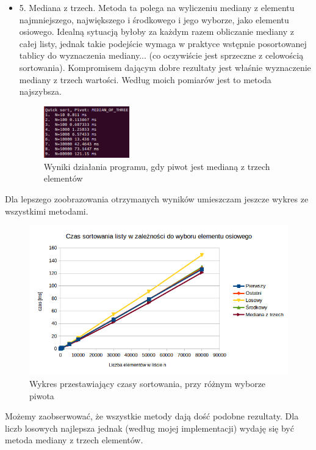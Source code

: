 \documentclass[11pt]{article}
\begin{document}
\begin{itemize}
\item 5. Mediana z trzech. \newline
Metoda ta polega na wyliczeniu mediany z elementu najmniejszego, największego i środkowego i jego wyborze, jako elementu osiowego. Idealną sytuacją byłoby za każdym razem obliczanie mediany z całej listy, jednak takie podejście wymaga w praktyce wstępnie posortowanej tablicy do wyznaczenia mediany... (co oczywiście jest sprzeczne z celowością sortowania). Kompromisem dającym dobre rezultaty jest właśnie wyznaczenie mediany z trzech wartości. Według moich pomiarów jest to metoda najszybsza.
\begin{figure}[ht]
\centering
\includegraphics[width=0.35\textwidth]{median.png}
\caption{Wyniki działania programu, gdy piwot jest medianą z trzech elementów}
\label{fig1}
\end{figure}

\end{itemize}
\newpage
Dla lepszego zoobrazowania otrzymanych wyników umieszczam jeszcze wykres ze wszystkimi metodami.
\newline
\begin{figure}[ht]
\centering
\includegraphics[width=1\textwidth]{wykres.png}
\caption{Wykres przestawiający czasy sortowania, przy różnym wyborze piwota}
\label{fig1}
\end{figure}
Możemy zaobserwować, że wszystkie metody dają dość podobne rezultaty. Dla liczb losowych najlepsza jednak (według mojej implementacji) wydaję się być metoda mediany z trzech elementów.
\end{document}
